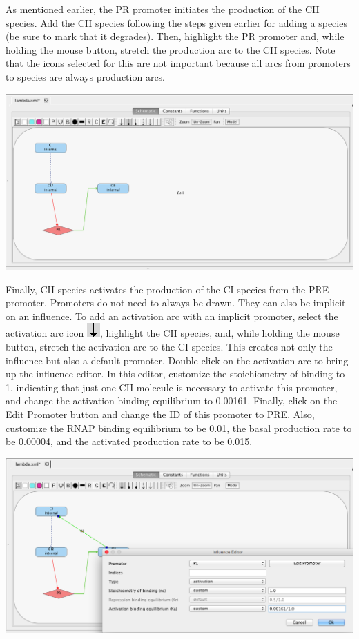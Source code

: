 \documentclass[titlepage,11pt]{article}
\begin{document}
As mentioned earlier, the PR promoter initiates the production of the CII species.  Add the CII species following the steps given earlier for adding a species (be sure to mark that it degrades).  Then, highlight the PR promoter and, while holding the mouse button, stretch the production arc to the CII species.  Note that the icons selected for this are not important because all arcs from promoters to species are always production arcs.

\begin{center}
\includegraphics[width=160mm]{screenshots/production}
\end{center}

Finally, CII species activates the production of the CI species from the PRE promoter.  Promoters do not need to always be drawn.  They can also be implicit on an influence.  To add an activation arc with an implicit promoter, select the activation arc icon \includegraphics{../gui/icons/modelview/activation_selected}, highlight the CII species, and, while holding the mouse button, stretch the activation arc to the CI species.  This creates not only the influence but also a default promoter.  Double-click on the activation arc to bring up the influence editor.  In this editor, customize the stoichiometry of binding to 1, indicating that just one CII molecule is necessary to activate this promoter, and change the activation binding equilibrium to 0.00161.  Finally, click on the Edit Promoter button and change the ID of this promoter to PRE.  Also, customize the RNAP binding equilibrium to be 0.01, the basal production rate to be 0.00004, and the activated production rate to be 0.015.

\begin{center}
\includegraphics[width=160mm]{screenshots/activation}
\end{center}
\end{document}
